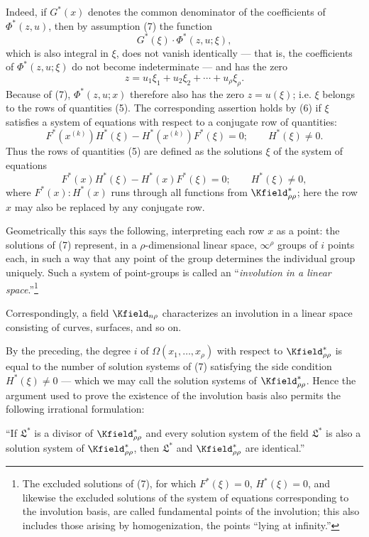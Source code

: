 \documentclass[11pt]{article}
\begin{document}
Indeed, if $G^*(x)$ denotes the common denominator of the coefficients of $\Phi^*(z,u)$, then by assumption (7) the function
\[
  G^*(\xi)\cdot\Phi^*(z,u;\xi),
\]
which is also integral in $\xi$, does not vanish identically --- that is, the coefficients of $\Phi^*(z,u;\xi)$ do not become indeterminate --- and has the zero
\[
  z=u_1\xi_1+u_2\xi_2+\cdots+u_\rho\xi_\rho.
\]
Because of (7), $\Phi^*(z,u;x)$ therefore also has the zero $z=u(\xi)$; i.e. $\xi$ belongs to the rows of quantities (5). The corresponding assertion holds by (6) if $\xi$ satisfies a system of equations with respect to a conjugate row of quantities:
\[
  F^*(x^{(k)})H^*(\xi)-H^*(x^{(k)})F^*(\xi)=0;
  \qquad H^*(\xi)\ne0.
\]
Thus the rows of quantities (5) are defined as the solutions $\xi$ of the system of equations
\[
  F^*(x)H^*(\xi)-H^*(x)F^*(\xi)=0;
  \qquad H^*(\xi)\ne0,
\]
where $F^*(x):H^*(x)$ runs through all functions from $\Kfield^*_{\rho\rho}$; here the row $x$ may also be replaced by any conjugate row.

Geometrically this says the following, interpreting each row $x$ as a point: the solutions of (7) represent, in a $\rho$-dimensional linear space, $\infty^\rho$ groups of $i$ points each, in such a way that any point of the group determines the individual group uniquely. Such a system of point-groups is called an ``\emph{involution in a linear space}.''\footnote{The excluded solutions of (7), for which $F^*(\xi)=0$, $H^*(\xi)=0$, and likewise the excluded solutions of the system of equations corresponding to the involution basis, are called fundamental points of the involution; this also includes those arising by homogenization, the points ``lying at infinity.''}

Correspondingly, a field $\Kfield_{n\rho}$ characterizes an involution in a linear space consisting of curves, surfaces, and so on.

By the preceding, the degree $i$ of $\Omega(x_1,
\ldots,x_\rho)$ with respect to $\Kfield^*_{\rho\rho}$ is equal to the number of solution systems of (7) satisfying the side condition $H^*(\xi)\ne0$ --- which we may call the solution systems of $\Kfield^*_{\rho\rho}$. Hence the argument used to prove the existence of the involution basis also permits the following irrational formulation:

``If $\mathfrak{L}^*$ is a divisor of $\Kfield^*_{\rho\rho}$ and every solution system of the field $\mathfrak{L}^*$ is also a solution system of $\Kfield^*_{\rho\rho}$, then $\mathfrak{L}^*$ and $\Kfield^*_{\rho\rho}$ are identical.''
\end{document}
